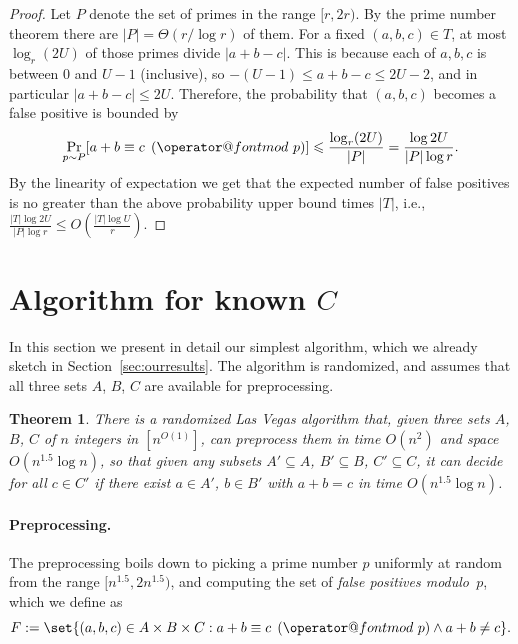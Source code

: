 \documentclass[10pt,a4paper]{article}
\makeatletter
\newtheorem{theorem}{Theorem}[section]
\newcommand{\tpmod}[1]{\mkern 8mu({\operator@font mod}\mkern 6mu#1)}
\makeatother
\begin{document}
\begin{proof}
Let $P$ denote the set of primes in the range $[r,2r)$. By the prime number theorem there are $|P| = \Theta(r / \log r)$ of them. For a fixed $(a,b,c) \in T$, at most $\log_r(2U)$ of those primes divide $|a+b-c|$. This is because each of $a,b,c$ is between $0$ and $U-1$ (inclusive), so $-(U-1) \leqslant a+b-c \leqslant 2U - 2$, and in particular $|a+b-c| \leqslant 2U$. Therefore, the probability that $(a,b,c)$ becomes a false positive is bounded by
\[\operatornamewithlimits{Pr}_{p \sim P}[a + b \equiv c \tpmod{p}] \leqslant \frac{\log_r(2U)}{|P|} = \frac{\log 2U}{|P| \log r}.\]
By the linearity of expectation we get that the expected number of false positives is no greater than the above probability upper bound times $|T|$, i.e., $\frac{|T|\log 2U}{|P| \log r} \leqslant O(\frac{|T|\log U}{r})$.
\end{proof}
        
\section{Algorithm for known \texorpdfstring{$C$}{C}}
\label{sec:knownc}

In this section we present in detail our simplest algorithm, which we already sketch in Section~\ref{sec:ourresults}. The algorithm is randomized, and assumes that all three sets $A$, $B$, $C$ are available for preprocessing.
    
\begin{theorem}\label{thm:knownc}
    There is a randomized Las Vegas algorithm that,
    given three sets $A$, $B$, $C$ of $n$ integers in $[n^{O(1)}]$, can preprocess them in time $O(n^2)$ and space $O(n^{1.5} \log n)$, so that given any subsets $A' \subseteq A$, $B' \subseteq B$, $C' \subseteq C$, it can decide for all $c \in C'$ if there exist $a \in A'$, $b \in B'$ with $a+b=c$ in time $O(n^{1.5} \log n)$.
\end{theorem}

\paragraph{Preprocessing.}

The preprocessing boils down to picking a prime number $p$ uniformly at random from the range $[n^{1.5}, 2n^{1.5})$, and computing the set of \emph{false positives modulo~$p$}, which we define as
\[F:= \set{ (a,b,c) \in A \times B \times C : a + b \equiv c \tpmod{p} \land a + b \neq c }.\]
\end{document}
